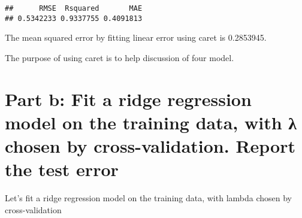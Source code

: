 \documentclass[]{article}
\newenvironment{Shaded}{\begin{snugshade}}{\end{snugshade}}
\newcommand{\DataTypeTok}[1]{\textcolor[rgb]{0.13,0.29,0.53}{#1}}
\newcommand{\DecValTok}[1]{\textcolor[rgb]{0.00,0.00,0.81}{#1}}
\newcommand{\KeywordTok}[1]{\textcolor[rgb]{0.13,0.29,0.53}{\textbf{#1}}}
\newcommand{\NormalTok}[1]{#1}
\newcommand{\OperatorTok}[1]{\textcolor[rgb]{0.81,0.36,0.00}{\textbf{#1}}}
\newcommand{\OtherTok}[1]{\textcolor[rgb]{0.56,0.35,0.01}{#1}}
\newcommand{\StringTok}[1]{\textcolor[rgb]{0.31,0.60,0.02}{#1}}
\begin{document}
\begin{Shaded}
\end{Shaded}

\begin{verbatim}
##      RMSE  Rsquared       MAE 
## 0.5342233 0.9337755 0.4091813
\end{verbatim}

The mean squared error by fitting linear error using caret is 0.2853945.

The purpose of using caret is to help discussion of four model.

\hypertarget{part-b-fit-a-ridge-regression-model-on-the-training-data-with--chosen-by-cross-validation.-report-the-test-error}{%
\section{Part b: Fit a ridge regression model on the training data, with
λ chosen by cross-validation. Report the test
error}\label{part-b-fit-a-ridge-regression-model-on-the-training-data-with--chosen-by-cross-validation.-report-the-test-error}}

Let's fit a ridge regression model on the training data, with lambda
chosen by cross-validation

\begin{Shaded}
\end{Shaded}
\end{document}
